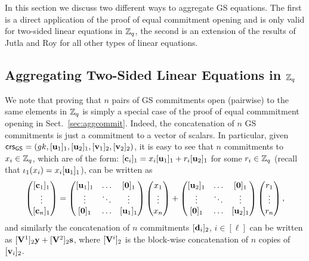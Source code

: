 In this section we discuss two different ways to aggregate GS equations. The first is a direct application of the proof of equal commitment opening and is only valid for two-sided linear equations in $\mathbb{Z}_q$, the second is an extension of the results of Jutla and Roy for all other types of linear equations.

\subsection{Aggregating Two-Sided Linear Equations in $\mathbb{Z}_q$}
\label{sec:ts-zq}
We note that proving that $n$ pairs of GS commitments open (pairwise) to the same elements in $\mathbb{Z}_q$ is simply a special case of 
the proof of equal commmitment opening in Sect.~\ref{sec:aggcommit}. Indeed, the concatenation of $n$ GS commitments is just a commitment to a vector of scalars. In particular,  given $\mathsf{crs}_{\mathsf{GS}}=({gk},[\mathbf{u}_1]_1,[\mathbf{u}_2]_1,[\mathbf{v}_1]_2,[\mathbf{v}_2]_2)$,  it is easy to see that  $n$ commitments to $x_i \in \mathbb{Z}_q$, which are of the form:
 $[\mathbf{c}_i]_1= x_i [\mathbf{u}_1]_1 +r_i [\mathbf{u}_2]_1$ for some $r_i \in \mathbb{Z}_q$ (recall that $\iota_1(x_i)= x_i [\mathbf{u}_1]_1$), can be written as  
 $$\begin{pmatrix} [\vecb{c}_1]_1 \\ \vdots \\ [\vecb{c}_n]_1 \end{pmatrix}=   \begin{pmatrix} [\vecb{u}_1]_1 & \ldots & [\vecb{0}]_1\\ \vdots & \ddots & \vdots \\   [\vecb{0}]_1 & \ldots & [\vecb{u}_1]_1  \end{pmatrix} \begin{pmatrix} x_1 \\ \vdots \\ x_n \end{pmatrix}
 + \begin{pmatrix} [\vecb{u}_2]_1 & \ldots & [\vecb{0}]_1\\ \vdots & \ddots & \vdots \\  [\vecb{0}]_1 & \ldots & [\vecb{u}_2]_1  \end{pmatrix}
 \begin{pmatrix} r_1 \\ \vdots \\ r_n \end{pmatrix},
 $$
and similarly the concatenation of $n$ commitments $[\mathbf{d}_i]_2$, $i \in [\ell]$ can be written as $[\mathbf{{V}}^1]_2\mathbf{y}+[\mathbf{{V}}^2]_2 \mathbf{s}$, where $[\mathbf{{V}}^i]_2$ is the block-wise concatenation of $n$ copies of $[\mathbf{v}_i]_2$.  

